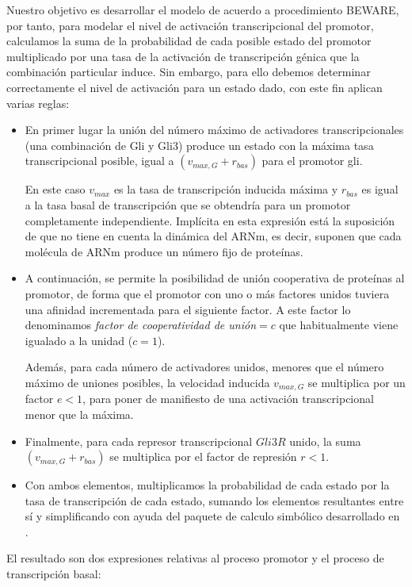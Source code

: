   
  Nuestro objetivo es desarrollar el modelo de acuerdo a procedimiento BEWARE, por tanto, para modelar el nivel de activación transcripcional del promotor, calculamos la suma de la probabilidad de cada posible estado del promotor multiplicado por una tasa de la activación de transcripción génica que la combinación particular
  induce.
  Sin embargo, para ello debemos determinar correctamente  el nivel de activación para un estado dado, con este fin \cite{schaffer,saha} aplican varias reglas:
   \begin{itemize}
   	 
   
   \item En primer lugar la unión del número máximo de activadores transcripcionales (una combinación de Gli y Gli3) produce un estado con la máxima tasa transcripcional  posible, igual a $(v_{max,G} + r_{bas})$ para el promotor gli.
  
  En este caso $v_{max}$ es la tasa de transcripción inducida máxima y $r_{bas}$ es igual a la tasa basal de transcripción que se obtendría para un promotor completamente independiente.
   Implícita en esta expresión está la suposición de que \cite{schaffer} no tiene en cuenta la dinámica del ARNm, es decir, suponen que cada molécula de ARNm produce un número fijo de proteínas. 
   
   
  \item A continuación, se permite la posibilidad de unión cooperativa de proteínas al promotor, de forma que el promotor con uno o más factores unidos tuviera una afinidad incrementada para el siguiente factor. A este factor lo denominamos \textit{factor de cooperatividad de unión}$=c$ que habitualmente viene igualado a la unidad ($c=1$).
  
   Además, para cada número de activadores unidos, menores que el número máximo de uniones posibles, la velocidad inducida $v_{max, G}$ se multiplica por un factor $e<1$, para poner de manifiesto de una activación transcripcional menor que la máxima. 

\item Finalmente, para cada represor transcripcional $Gli3R$ unido, la suma $(v_{max, G}+ r_{bas})$ se multiplica por el factor de represión $r<1$.
  
\item Con ambos elementos, multiplicamos la probabilidad de cada estado por la tasa de transcripción de cada estado, sumando los elementos resultantes entre sí y simplificando con ayuda del paquete de calculo simbólico desarrollado en \cite{sympy}. 
\end{itemize}
 El resultado son dos expresiones relativas al proceso promotor y el proceso de transcripción basal:

